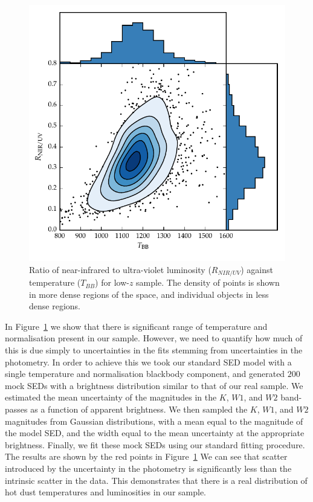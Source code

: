 \begin{figure}[h!]
  \centering
  \includegraphics[width=\textwidth]{figures/chapter05/ratio_tbb_density.pdf}
  \caption[{Ratio of near-infrared to ultra-violet luminosity ($R_{NIR/UV}$) against temperature ($T_{BB}$) for low-$z$ sample.}]{Ratio of near-infrared to ultra-violet luminosity ($R_{NIR/UV}$) against temperature ($T_{BB}$) for low-$z$ sample. The density of points is shown in more dense regions of the space, and individual objects in less dense regions.}
  \label{fig:ratio_tbb_density}
\end{figure}

In Figure~\ref{fig:ratio_tbb_density} we show that there is significant range of temperature and normalisation present in our sample. 
However, we need to quantify  how much of this is due simply to uncertainties in the fits stemming from uncertainties in the photometry. 
In order to achieve this we took our standard SED model with a single temperature and normalisation blackbody component, and generated $200$ mock SEDs with a brightness distribution similar to that of our real sample. 
We estimated the mean uncertainty of the magnitudes in the $K$, $W1$, and $W2$ band-passes as a function of apparent brightness. 
We then sampled the $K$, $W1$, and $W2$ magnitudes from Gaussian distributions, with a mean equal to the magnitude of the model SED, and the width equal to the mean uncertainty at the appropriate brightness. 
Finally, we fit these mock SEDs using our standard fitting procedure. 
The results are shown by the red points in Figure~\ref{fig:ratio_tbb_density}
We can see that scatter introduced by the uncertainty in the photometry is significantly less than the intrinsic scatter in the data. 
This demonstrates that there is a real distribution of hot dust temperatures and luminosities in our sample. 

